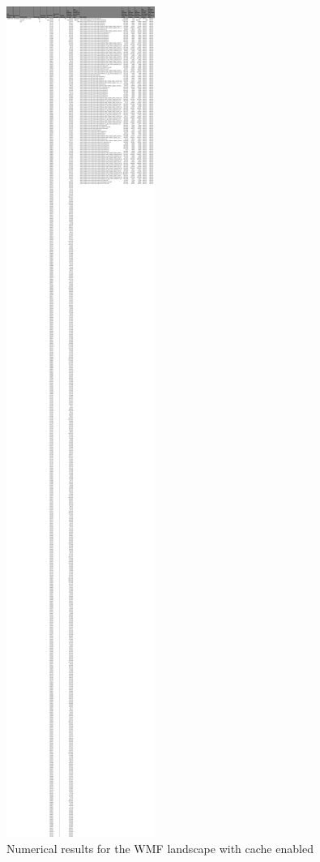 \newpage
\begin{figure}[!h]
	\centering
	\begin{adjustbox}{width=\textwidth,totalheight=0.9\textheight}
		\includegraphics[angle=90]{Figures/wmf_allhar_cache.pdf}
	\end{adjustbox}
	\caption{Numerical results for the WMF landscape with cache enabled}
	\label{fig:appendix_1_27}
\end{figure}
